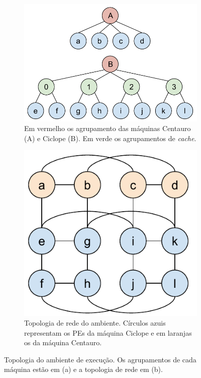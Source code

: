 \begin{figure}[h]
\begin{subfigure}{.6\textwidth}
    \centering
    \includegraphics[width=0.8\linewidth]{images/init_real_topo.pdf}
    \caption{Em vermelho os agrupamento das máquinas Centauro (A) e Ciclope (B). Em verde os agrupamentos de \textit{cache}.}
    \label{fig:exec:machine_topos}
\end{subfigure}
\begin{subfigure}{.4\textwidth}
    \centering
    \includegraphics[width=0.8\linewidth]{images/execucao_topo.pdf}
    \caption{Topologia de rede do ambiente. Círculos azuis representam os PEs da máquina Ciclope e em laranjas os da máquina Centauro.}
    \label{fig:exec:full_topos}
\end{subfigure}
\caption[Topologia das máquinas Ciclope e Centauro.]{Topologia do ambiente de execução. Os agrupamentos de cada máquina  estão em (a) e a topologia de rede em (b).}
\label{fig:run_topology}
\end{figure}

